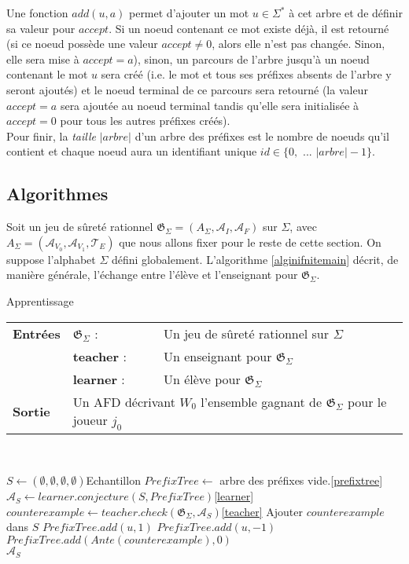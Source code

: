 \documentclass[12pt,a4paper,oneside,titlepage]{report}
\begin{document}
Une fonction $add(u, a)$ permet d'ajouter un mot $u\in\Sigma^*$ à cet arbre et de définir sa valeur pour $accept$. Si un noeud contenant ce mot existe déjà, il est retourné (si ce noeud possède une valeur $accept\neq 0$, alors elle n'est pas changée. Sinon, elle sera mise à $accept=a$), sinon, un parcours de l'arbre jusqu'à un noeud contenant le mot $u$ sera créé (i.e. le mot et tous ses préfixes absents de l'arbre y seront ajoutés) et le noeud terminal de ce parcours sera retourné (la valeur $accept=a$ sera ajoutée au noeud terminal tandis qu'elle sera initialisée à $accept=0$ pour tous les autres préfixes créés).\\
Pour finir, la \emph{taille} $|arbre|$ d'un arbre des préfixes est le nombre de noeuds qu'il contient et chaque noeud aura un identifiant unique $id\in\{0,$ $...$ $|arbre|-1\}$.

\subsection{Algorithmes}
Soit un jeu de sûreté rationnel $\mathfrak{G}_\Sigma=(A_\Sigma, \mathcal{A}_I, \mathcal{A}_F)$ sur $\Sigma$, avec $A_\Sigma=(\mathcal{A}_{V_0}, \mathcal{A}_{V_1}, \mathcal{T}_E)$ que nous allons fixer pour le reste de cette section. On suppose l'alphabet $\Sigma$ défini globalement. L'algorithme \ref{alginifnitemain} décrit, de manière générale, l'échange entre l'élève et l'enseignant pour $\mathfrak{G}_\Sigma$.
\begin{algorithm}[H]
\caption{Apprentissage}\label{alginifnitemain}
\hspace*{\algorithmicindent} 
\begin{tabular}{lll}
	\textbf{Entrées} & \textbf{$\mathfrak{G}_\Sigma$} : &Un jeu de sûreté rationnel sur $\Sigma$\\
	&\textbf{teacher} : &Un enseignant pour $\mathfrak{G}_\Sigma$\\
	&\textbf{learner} : &Un élève pour $\mathfrak{G}_\Sigma$\\
	\textbf{Sortie} &\multicolumn{2}{l}{Un AFD décrivant $W_0$ l'ensemble gagnant de $\mathfrak{G}_\Sigma$ pour le joueur $j_0$}\\
\end{tabular}\\
\begin{algorithmic}[1]
\State $S\gets(\emptyset,\emptyset,\emptyset,\emptyset)$\Comment Echantillon
\State $PrefixTree\gets$ arbre des préfixes vide.\Comment\ref{prefixtree}
\Repeat
	\State $\mathcal{A}_S \gets learner.conjecture(S, PrefixTree)$\Comment \ref{learner}
	\State $counterexample\gets teacher.check(\mathfrak{G}_\Sigma, \mathcal{A}_S)$\Comment\ref{teacher}
		\State Ajouter $counterexample$ dans $S$
			\State $PrefixTree.add(u, 1)$
			\State $PrefixTree.add(u, -1)$
		\Else
			\State $PrefixTree.add(Ante(counterexample), 0)$
		\EndIf
	\EndIf	
{}\\
\Return $\mathcal{A}_S$
\end{algorithmic}
\end{algorithm}
\end{document}
